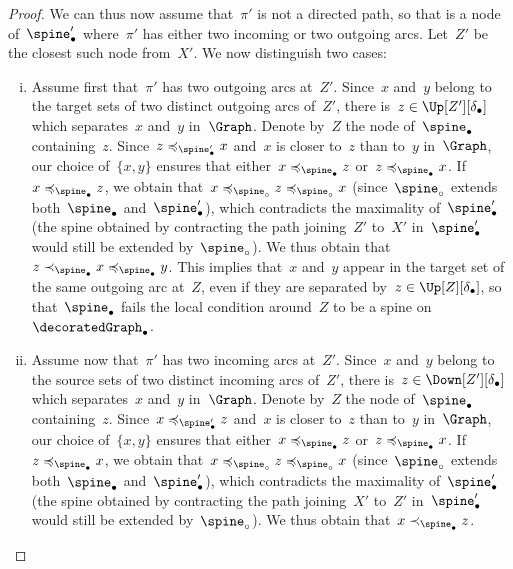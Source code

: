 \documentclass{amsart}
\theoremstyle{definition}
\newcommand{\decoration}{\delta}
\begin{document}
\begin{proof}
  We can thus now assume that~$\pi'$ is not a directed path, so that is a node of~$\spine_\bullet'$ where~$\pi'$ has either two incoming or two outgoing arcs.
  Let~$Z'$ be the closest such node from~$X'$.
  We now distinguish two cases:
  \begin{enumerate}[(i)]
    \item Assume first that~$\pi'$ has two outgoing arcs at~$Z'$.
    Since~$x$ and~$y$ belong to the target sets of two distinct outgoing arcs of~$Z'$, there is~$z \in \Up[Z'][\decoration_\bullet]$ which separates~$x$ and~$y$ in~$\Graph$.
    Denote by~$Z$ the node of~$\spine_\bullet$ containing~$z$.
    Since~$z \preccurlyeq_{\spine_\bullet'} x$ and~$x$ is closer to~$z$ than to~$y$ in~$\Graph$, our choice of~$\{x,y\}$ ensures that either~$x \preccurlyeq_{\spine_\bullet} z$ or~$z \preccurlyeq_{\spine_\bullet} x$.
    If~$x \preccurlyeq_{\spine_\bullet} z$, we obtain that~$x \preccurlyeq_{\spine_\circ} z \preccurlyeq_{\spine_\circ} x$ (since~$\spine_\circ$ extends both~$\spine_\bullet$ and~$\spine_\bullet'$), which contradicts the maximality of~$\spine_\bullet'$ (the spine obtained by contracting the path joining~$Z'$ to~$X'$ in~$\spine_\bullet'$ would still be extended by~$\spine_\circ$).
    We thus obtain that~$z \prec_{\spine_\bullet} x \preccurlyeq_{\spine_\bullet} y$.
    This implies that~$x$ and~$y$ appear in the target set of the same outgoing arc at~$Z$, even if they are separated by~$z \in \Up[Z][\decoration_\bullet]$, so that~$\spine_\bullet$ fails the local condition around~$Z$ to be a spine on~$\decoratedGraph_\bullet$.
    \item Assume now that~$\pi'$ has two incoming arcs at~$Z'$.
    Since~$x$ and~$y$ belong to the source sets of two distinct incoming arcs of~$Z'$, there is~$z \in \Down[Z'][\decoration_\bullet]$ which separates~$x$ and~$y$ in~$\Graph$.
    Denote by~$Z$ the node of~$\spine_\bullet$ containing~$z$.
    Since~$x \preccurlyeq_{\spine_\bullet'} z$ and~$x$ is closer to~$z$ than to~$y$ in~$\Graph$, our choice of~$\{x,y\}$ ensures that either~$x \preccurlyeq_{\spine_\bullet} z$ or~$z \preccurlyeq_{\spine_\bullet} x$.
    If~$z \preccurlyeq_{\spine_\bullet} x$, we obtain that~$x \preccurlyeq_{\spine_\circ} z \preccurlyeq_{\spine_\circ} x$ (since~$\spine_\circ$ extends both~$\spine_\bullet$ and~$\spine_\bullet'$), which contradicts the maximality of~$\spine_\bullet'$ (the spine obtained by contracting the path joining~$X'$ to~$Z'$ in~$\spine_\bullet'$ would still be extended by~$\spine_\circ$).
    We thus obtain that~$x \prec_{\spine_\bullet} z$.

\end{enumerate}
\end{proof}
\end{document}
